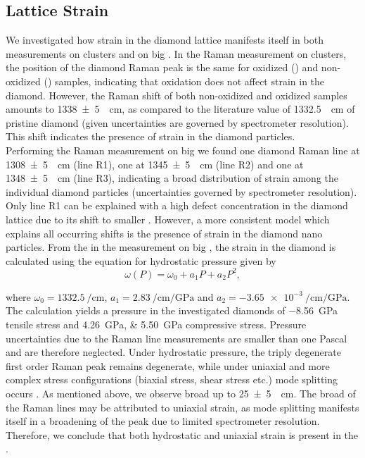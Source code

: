 			\subsection{Lattice Strain}\label{subsec::raman_strain}

				We investigated how strain in the diamond lattice manifests itself in both measurements on \nd clusters and on big \nds.
				In the Raman measurement on \nd clusters, the position of the diamond Raman peak is the same for oxidized (\insituSo) and non-oxidized (\insituSn) samples, indicating that oxidation does not affect strain in the diamond.
				However, the Raman shift of both non-oxidized and oxidized samples amounts to \SI[separate-uncertainty]{1338+-5}{\per\centi\meter}, as compared to the literature value of \SI{1332.5}{\per\centi\meter} of pristine diamond \cite{Zaitsev2001} (given uncertainties are governed by spectrometer resolution).
				This shift indicates the presence of strain in the diamond particles.
				\\
				Performing the Raman measurement on big \nds we found one diamond Raman line at \SI[separate-uncertainty]{1308+-5}{\per\centi\meter} (line R1), one at \SI[separate-uncertainty]{1345+-5}{\per\centi\meter} (line R2) and one at \SI[separate-uncertainty]{1348+-5}{\per\centi\meter} (line R3), indicating a broad distribution of strain among the individual diamond particles (uncertainties governed by spectrometer resolution).
				Only line R1 can be explained with a high defect concentration in the diamond lattice due to its shift to smaller \wl.
				However, a more consistent model which explains all occurring shifts is the presence of strain in the diamond nano particles.
				From the \lws in the measurement on big \nds, the strain in the diamond is calculated using the equation for hydrostatic pressure \cite{Prawer2004} given by
				\begin{equation}
					\omega(P)=\omega_0+a_1P+a_2P^2,
				\end{equation}

				where $\omega_0=\SI{1332.5}{\per\centi\meter}$, $a_1=\SI{2.83}{\per\centi\meter\per\giga\pascal}$ and $a_2=\SI{-3.65e-3}{\per\centi\meter\per\giga\pascal}$.
				The calculation yields a pressure in the investigated diamonds of \SI{-8.56}{\giga\pascal} tensile stress and \SIlist{4.26;5.50}{\giga\pascal} compressive stress.
				Pressure uncertainties due to the Raman line measurements are smaller than one Pascal and are therefore neglected.
				Under hydrostatic pressure, the triply degenerate first order Raman peak remains degenerate, while under uniaxial and more complex stress configurations (biaxial stress, shear stress etc.) mode splitting occurs \cite{Prawer2004}.
				As mentioned above, we observe broad \lws up to \SI[separate-uncertainty]{25+-5}{\per\centi\meter}.
				The broad \lws of the Raman lines may be attributed to uniaxial strain, as mode splitting manifests itself in a broadening of the peak due to limited spectrometer resolution.
				Therefore, we conclude that both hydrostatic and uniaxial strain is present in the \nds.

